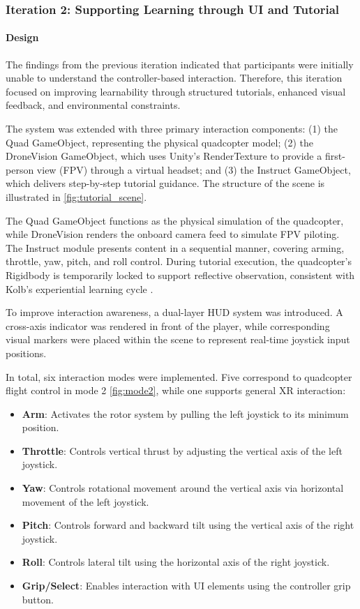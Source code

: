 \subsubsection{Iteration 2: Supporting Learning through UI and Tutorial}

\paragraph{Design}

The findings from the previous iteration indicated that participants were initially unable to understand the controller-based interaction. Therefore, this iteration focused on improving learnability through structured tutorials, enhanced visual feedback, and environmental constraints.

The system was extended with three primary interaction components: (1) the Quad GameObject, representing the physical quadcopter model; (2) the DroneVision GameObject, which uses Unity's RenderTexture to provide a first-person view (FPV) through a virtual headset; and (3) the Instruct GameObject, which delivers step-by-step tutorial guidance. The structure of the scene is illustrated in \cref{fig:tutorial_scene}.

The Quad GameObject functions as the physical simulation of the quadcopter, while DroneVision renders the onboard camera feed to simulate FPV piloting. The Instruct module presents content in a sequential manner, covering arming, throttle, yaw, pitch, and roll control. During tutorial execution, the quadcopter's Rigidbody is temporarily locked to support reflective observation, consistent with Kolb's experiential learning cycle \parencite{kolb1984}.



To improve interaction awareness, a dual-layer HUD system was introduced. A cross-axis indicator was rendered in front of the player, while corresponding visual markers were placed within the scene to represent real-time joystick input positions.

In total, six interaction modes were implemented. Five correspond to quadcopter flight control in mode 2 \cref{fig:mode2}, while one supports general XR interaction:

\begin{itemize}
    \item \textbf{Arm}: Activates the rotor system by pulling the left joystick to its minimum position.
    \item \textbf{Throttle}: Controls vertical thrust by adjusting the vertical axis of the left joystick.
    \item \textbf{Yaw}: Controls rotational movement around the vertical axis via horizontal movement of the left joystick.
    \item \textbf{Pitch}: Controls forward and backward tilt using the vertical axis of the right joystick.
    \item \textbf{Roll}: Controls lateral tilt using the horizontal axis of the right joystick.
    \item \textbf{Grip/Select}: Enables interaction with UI elements using the controller grip button.
\end{itemize}


